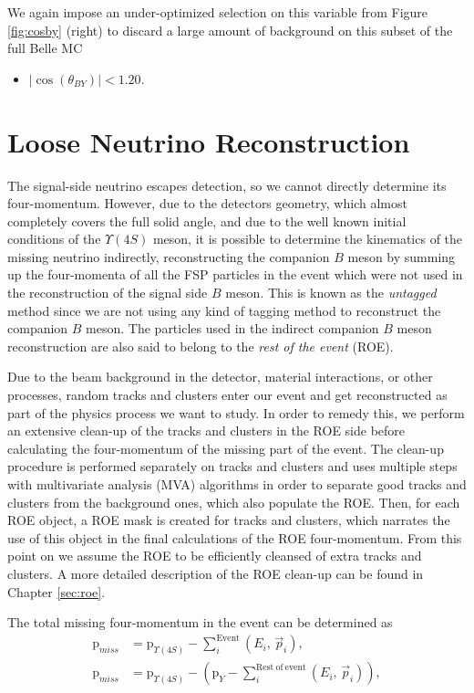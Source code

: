 We again impose an under-optimized selection on this variable from Figure \ref{fig:cosby} (right) to discard a large amount of background on this subset of the full Belle MC
\begin{itemize}
	\item $\vert \cos \left(\theta_{BY}\right) \vert < 1.20$.
\end{itemize}

\section{Loose Neutrino Reconstruction}\label{sec:loose-neutrino-reconstruction}
The signal-side neutrino escapes detection, so we cannot directly determine its four-momentum. However, due to the detectors geometry, which almost completely covers the full solid angle, and due to the well known initial conditions of the $\Upsilon(4S)$ meson, it is possible to determine the kinematics of the missing neutrino indirectly, reconstructing the companion $B$ meson by summing up the four-momenta of all the FSP particles in the event which were not used in the reconstruction of the signal side $B$ meson. This is known as the \textit{untagged} method since we are not using any kind of tagging method to reconstruct the companion $B$ meson. The particles used in the indirect companion $B$ meson reconstruction are also said to belong to the \textit{rest of the event} (ROE).

Due to the beam background in the detector, material interactions, or other processes, random tracks and clusters enter our event and get reconstructed as part of the physics process we want to study. In order to remedy this, we perform an extensive clean-up of the tracks and clusters in the ROE side before calculating the four-momentum of the missing part of the event. The clean-up procedure is performed separately on tracks and clusters and uses multiple steps with multivariate analysis (MVA) algorithms in order to separate good tracks and clusters from the background ones, which also populate the ROE. Then, for each ROE object, a ROE mask is created for tracks and clusters, which narrates the use of this object in the final calculations of the ROE four-momentum. From this point on we assume the ROE to be efficiently cleansed of extra tracks and clusters. A more detailed description of the ROE clean-up can be found in Chapter \ref{sec:roe}. 

The total missing four-momentum in the event can be determined as
\begin{align}
\mathrm{p}_{miss} &= \mathrm{p}_{\Upsilon(4S)} - \sum_i^{\mathrm{Event}}\left(E_i,\,\vec{p}_i \right),\\
\label{eq:ROEloop}
\mathrm{p}_{miss} &= \mathrm{p}_{\Upsilon(4S)} - \left(\mathrm{p}_{Y} -\sum_i^{\mathrm{Rest~of~event}}\left(E_i,\,\vec{p}_i \right)\right),
\end{align}

